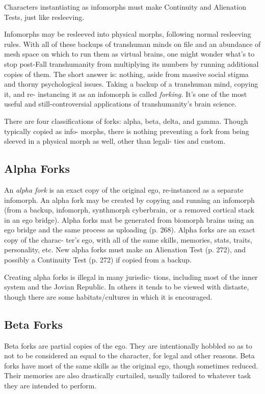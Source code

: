 Characters instantiating as infomorphs must make 
Continuity and Alienation Tests, just like resleeving.

Infomorphs may be resleeved into physical morphs, 
following normal resleeving rules.
With all of these backups of transhuman minds on 
file and an abundance of mesh space on which to run 
them as virtual brains, one might wonder what's to 
stop post-Fall transhumanity from multiplying its 
numbers by running additional copies of them. The 
short answer is: nothing, aside from massive social 
stigma and thorny psychological issues. Taking a 
backup of a transhuman mind, copying it, and re-
instancing it as an infomorph is called \textit{forking.} It's one 
of the most useful and still-controversial applications 
of transhumanity's brain science.

There are four classifications of forks: alpha, beta, 
delta, and gamma. Though typically copied as info-
morphs, there is nothing preventing a fork from being 
sleeved in a physical morph as well, other than legali-
ties and custom.

\subsection{Alpha Forks}

An \textit{alpha fork} is an exact copy of the original ego, 
re-instanced as a separate infomorph. An alpha fork 
may be created by copying and running an infomorph 
(from a backup, infomorph, synthmorph cyberbrain, 
or a removed cortical stack in an ego bridge). Alpha 
forks mat be generated from biomorph brains using 
an ego bridge and the same process as uploading (p. 
268). Alpha forks are an exact copy of the charac-
ter's ego, with all of the same skills, memories, stats, 
traits, personality, etc. New alpha forks must make 
an Alienation Test (p. 272), and possibly a Continuity 
Test (p. 272) if copied from a backup.

Creating alpha forks is illegal in many jurisdic-
tions, including most of the inner system and the 
Jovian Republic. In others it tends to be viewed with 
distaste, though there are some habitats/cultures in 
which it is encouraged.

\subsection{Beta Forks}

Beta forks are partial copies of the ego. They are 
intentionally hobbled so as to not to be considered 
an equal to the character, for legal and other reasons. 
Beta forks have most of the same skills as the original 
ego, though sometimes reduced. Their memories are 
also drastically curtailed, usually tailored to whatever 
task they are intended to perform.

